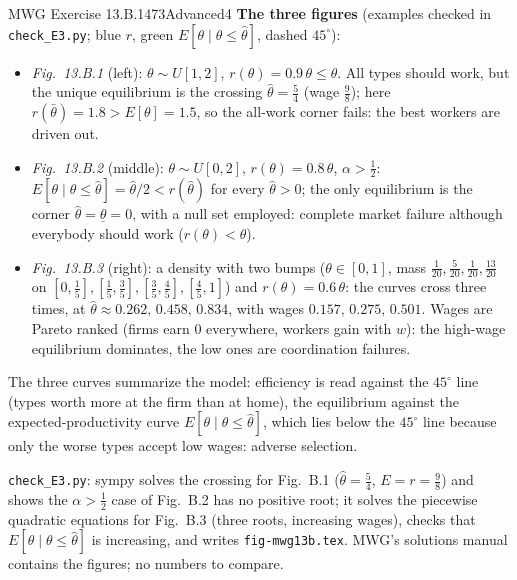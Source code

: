 \begin{exsol}{MWG Exercise 13.B.1}{473}{Advanced}{4}
\textbf{The three figures} (examples checked in \texttt{check\_E3.py}; blue $r$, green $E[\theta\mid\theta\le\hat\theta]$, dashed $45^\circ$):

\begin{itemize}
  \item \emph{Fig.~13.B.1} (left): $\theta\sim U[1,2]$, $r(\theta)=0.9\,\theta\le\theta$. All types should
  work, but the unique equilibrium is the crossing $\hat\theta=\tfrac54$ (wage $\tfrac98$); here
  $r(\bar\theta)=1.8>E[\theta]=1.5$, so the all-work corner fails: the best workers are driven out.
  \item \emph{Fig.~13.B.2} (middle): $\theta\sim U[0,2]$, $r(\theta)=0.8\,\theta$, $\alpha>\tfrac12$:
  $E[\theta\mid\theta\le\hat\theta]=\hat\theta/2<r(\hat\theta)$ for every $\hat\theta>0$; the only equilibrium
  is the corner $\hat\theta=\underline\theta=0$, with a null set employed: complete market failure although
  everybody should work ($r(\theta)<\theta$).
  \item \emph{Fig.~13.B.3} (right): a density with two bumps ($\theta\in[0,1]$, mass
  $\tfrac1{20},\tfrac5{20},\tfrac1{20},\tfrac{13}{20}$ on $[0,\tfrac15],[\tfrac15,\tfrac35],[\tfrac35,\tfrac45],[\tfrac45,1]$) and
  $r(\theta)=0.6\,\theta$: the curves cross three times, at $\hat\theta\approx0.262,\,0.458,\,0.834$,
  with wages $0.157,\,0.275,\,0.501$. Wages are Pareto ranked (firms earn $0$ everywhere,
  workers gain with $w$): the high-wage equilibrium dominates, the low ones are coordination failures.
\end{itemize}

\interp The three curves summarize the model: efficiency is read against the $45^\circ$ line
(types worth more at the firm than at home), the equilibrium against the expected-productivity
curve $E[\theta\mid\theta\le\hat\theta]$, which lies below the $45^\circ$ line because only the
worse types accept low wages: adverse selection.

\verify \texttt{check\_E3.py}: sympy solves the crossing for Fig.~B.1 ($\hat\theta=\tfrac54$,
$E=r=\tfrac98$) and shows the $\alpha>\tfrac12$ case of Fig.~B.2 has no positive root; it solves the piecewise
quadratic equations for Fig.~B.3 (three roots, increasing wages), checks that
$E[\theta\mid\theta\le\hat\theta]$ is increasing, and writes \texttt{fig-mwg13b.tex}.
MWG's solutions manual contains the figures; no numbers to compare.

\end{exsol}
